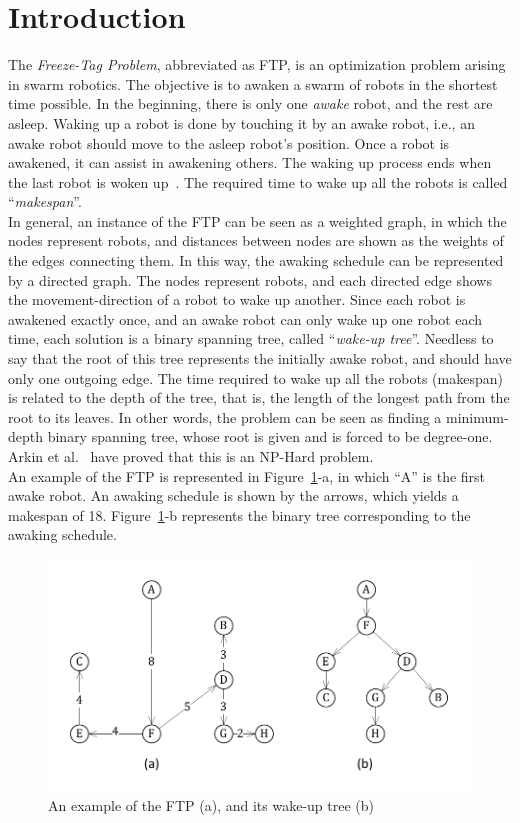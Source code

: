 \documentclass[review]{elsarticle}
\begin{document}
\section{Introduction}
The \textit{Freeze-Tag Problem}, abbreviated as FTP, is an optimization problem arising in swarm robotics. The objective is to awaken a swarm of robots in the shortest time possible. In the beginning, there is only one \textit{awake} robot, and the rest are asleep. Waking up a robot is done by touching it by an awake robot, i.e., an awake robot should move to the asleep robot's position. Once a robot is awakened, it can assist in awakening others. The waking up process ends when the last robot is woken up~\cite{Arkin2006}. The required time to wake up all the robots is called ``\textit{makespan}''.\\
In general, an instance of the FTP can be seen as a weighted graph, in which the nodes represent robots, and distances between nodes are shown as the weights of the edges connecting them. In this way, the awaking schedule can be represented by a directed graph. The nodes represent robots, and each directed edge shows the movement-direction of a robot to wake up another. Since each robot is awakened exactly once, and an awake robot can only wake up one robot each time, each solution is a binary spanning tree, called ``\textit{wake-up tree}''. Needless to say that the root of this tree represents the initially awake robot, and should have only one outgoing edge. The time required to wake up all the robots (makespan) is related to the depth of the tree, that is, the length of the longest path from the root to its leaves. In other words, the problem can be seen as finding a minimum-depth binary spanning tree, whose root is given and is forced to be degree-one. Arkin et al.~\cite{Arkin2006} have proved that this is an NP-Hard problem.\\
An example of the FTP is represented in Figure~\ref{fig:example}-a, in which ``A'' is the first awake robot. An awaking schedule is shown by the arrows, which yields a makespan of 18. Figure~\ref{fig:example}-b represents the binary tree corresponding to the awaking schedule.
\begin{figure}[h]
  \vspace{-10pt}
  \centering
  \includegraphics[scale=.7]{Figs/fig1.pdf}
  \vspace{-20pt}
  \caption{An example of the FTP (a), and its wake-up tree (b)}
  \label{fig:example}
\end{figure}
\end{document}
